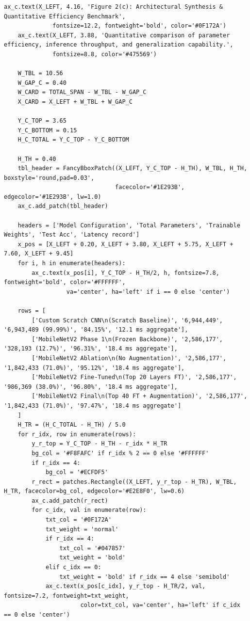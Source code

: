 \begin{lstlisting}[style=pycode]
    ax_c.text(X_LEFT, 4.16, 'Figure 2(c): Architectural Synthesis & Quantitative Efficiency Benchmark',
              fontsize=12.2, fontweight='bold', color='#0F172A')
    ax_c.text(X_LEFT, 3.88, 'Quantitative comparison of parameter efficiency, inference throughput, and generalization capability.',
              fontsize=8.8, color='#475569')

    W_TBL = 10.56
    W_GAP_C = 0.40
    W_CARD = TOTAL_SPAN - W_TBL - W_GAP_C
    X_CARD = X_LEFT + W_TBL + W_GAP_C

    Y_C_TOP = 3.65
    Y_C_BOTTOM = 0.15
    H_C_TOTAL = Y_C_TOP - Y_C_BOTTOM

    H_TH = 0.40
    tbl_header = FancyBboxPatch((X_LEFT, Y_C_TOP - H_TH), W_TBL, H_TH, boxstyle='round,pad=0.03',
                                facecolor='#1E293B', edgecolor='#1E293B', lw=1.0)
    ax_c.add_patch(tbl_header)

    headers = ['Model Configuration', 'Total Parameters', 'Trainable Weights', 'Test Acc', 'Latency record']
    x_pos = [X_LEFT + 0.20, X_LEFT + 3.80, X_LEFT + 5.75, X_LEFT + 7.60, X_LEFT + 9.45]
    for i, h in enumerate(headers):
        ax_c.text(x_pos[i], Y_C_TOP - H_TH/2, h, fontsize=7.8, fontweight='bold', color='#FFFFFF',
                  va='center', ha='left' if i == 0 else 'center')

    rows = [
        ['Custom Scratch CNN\n(Scratch Baseline)', '6,944,449', '6,943,489 (99.99%)', '84.15%', '12.1 ms aggregate'],
        ['MobileNetV2 Phase 1\n(Frozen Backbone)', '2,586,177', '328,193 (12.7%)', '96.31%', '18.4 ms aggregate'],
        ['MobileNetV2 Ablation\n(No Augmentation)', '2,586,177', '1,842,433 (71.0%)', '95.12%', '18.4 ms aggregate'],
        ['MobileNetV2 Fine-Tuned\n(Top 20 Layers FT)', '2,586,177', '986,369 (38.0%)', '96.80%', '18.4 ms aggregate'],
        ['MobileNetV2 Final\n(Top 40 FT + Augmentation)', '2,586,177', '1,842,433 (71.0%)', '97.47%', '18.4 ms aggregate']
    ]
    H_TR = (H_C_TOTAL - H_TH) / 5.0
    for r_idx, row in enumerate(rows):
        y_r_top = Y_C_TOP - H_TH - r_idx * H_TR
        bg_col = '#F8FAFC' if r_idx % 2 == 0 else '#FFFFFF'
        if r_idx == 4:
            bg_col = '#ECFDF5'
        r_rect = patches.Rectangle((X_LEFT, y_r_top - H_TR), W_TBL, H_TR, facecolor=bg_col, edgecolor='#E2E8F0', lw=0.6)
        ax_c.add_patch(r_rect)
        for c_idx, val in enumerate(row):
            txt_col = '#0F172A'
            txt_weight = 'normal'
            if r_idx == 4:
                txt_col = '#047857'
                txt_weight = 'bold'
            elif c_idx == 0:
                txt_weight = 'bold' if r_idx == 4 else 'semibold'
            ax_c.text(x_pos[c_idx], y_r_top - H_TR/2, val, fontsize=7.2, fontweight=txt_weight,
                      color=txt_col, va='center', ha='left' if c_idx == 0 else 'center')


\end{lstlisting}
